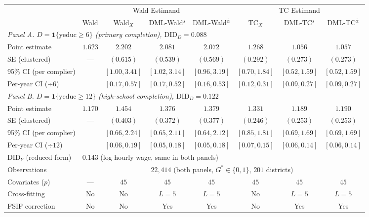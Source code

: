 \begin{tabular}{lccccccc}
\toprule
 & \multicolumn{4}{c}{Wald Estimand} & \multicolumn{3}{c}{TC Estimand} \\
\cmidrule(lr){2-5} \cmidrule(lr){6-8}
 & Wald & Wald$_X$ & DML-Wald$^{s}$ & DML-Wald$^{\hat\alpha}$ & TC$_X$ & DML-TC$^{s}$ & DML-TC$^{\hat\alpha}$ \\
\midrule
\multicolumn{8}{l}{\textit{Panel A. $D = \mathbf{1}\{\text{yeduc} \geq 6\}$ (primary completion), $\mathrm{DID}_D = 0.088$}} \\
\midrule
Point estimate            & $1.623$ & $2.202$ & $2.081$ & $2.072$ & $1.268$ & $1.056$ & $\mathbf{1.057}$ \\
SE (clustered)            & ---     & $(0.615)$ & $(0.539)$ & $(0.569)$ & $(0.292)$ & $(0.273)$ & $(\mathbf{0.273})$ \\
95\% CI (per complier)    &         & $[1.00, 3.41]$ & $[1.02, 3.14]$ & $[0.96, 3.19]$ & $[0.70, 1.84]$ & $[0.52, 1.59]$ & $[\mathbf{0.52, 1.59}]$ \\
Per-year CI ($\div 6$)    &         & $[0.17, 0.57]$ & $[0.17, 0.52]$ & $[0.16, 0.53]$ & $[0.12, 0.31]$ & $[0.09, 0.27]$ & $[\mathbf{0.09, 0.27}]$ \\
\midrule
\multicolumn{8}{l}{\textit{Panel B. $D = \mathbf{1}\{\text{yeduc} \geq 12\}$ (high-school completion), $\mathrm{DID}_D = 0.122$}} \\
\midrule
Point estimate            & $1.170$ & $1.454$ & $1.376$ & $1.379$ & $1.331$ & $1.189$ & $\mathbf{1.190}$ \\
SE (clustered)            & ---     & $(0.403)$ & $(0.372)$ & $(0.377)$ & $(0.246)$ & $(0.253)$ & $(\mathbf{0.253})$ \\
95\% CI (per complier)    &         & $[0.66, 2.24]$ & $[0.65, 2.11]$ & $[0.64, 2.12]$ & $[0.85, 1.81]$ & $[0.69, 1.69]$ & $[\mathbf{0.69, 1.69}]$ \\
Per-year CI ($\div 12$)   &         & $[0.06, 0.19]$ & $[0.05, 0.18]$ & $[0.05, 0.18]$ & $[0.07, 0.15]$ & $[0.06, 0.14]$ & $[\mathbf{0.06, 0.14}]$ \\
\midrule
$\mathrm{DID}_Y$ (reduced form)  & \multicolumn{7}{l}{$0.143$ (log hourly wage, same in both panels)} \\
Observations                     & \multicolumn{7}{c}{$22{,}414$ (both panels, $G^* \in \{0, 1\}$, $201$ districts)} \\
Covariates ($p$)                 & ---   & $45$  & $45$  & $45$  & $45$  & $45$  & $45$ \\
Cross-fitting                    & No    & No    & $L=5$ & $L=5$ & No    & $L=5$ & $L=5$ \\
FSIF correction                  & No    & No    & Yes   & Yes   & No    & Yes   & Yes \\
\bottomrule
\end{tabular}
